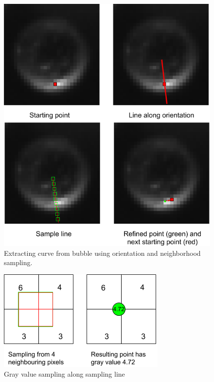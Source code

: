 				 \begin{figure}
				 	\centering
				 	\includegraphics[scale=.5]{images/curve_from_orientation.png}
				 	\caption{Extracting curve from bubble using orientation and neighborhood sampling.}
				 	\label{fig:curve_from_orientation}
				 \end{figure}
				 
				 \begin{figure}
				 	\centering
				 	\includegraphics[scale=.5]{images/subpixel_sampling.png}
				 	\caption{Gray value sampling along sampling line}
				 	\label{fig:subpixel_sampling}
				 \end{figure}
				 
